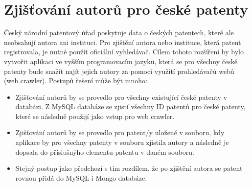 \section{Zjišťování autorů pro české patenty}
Český národní patentový úřad poskytuje data o českých patentech, které ale neobsahují autora ani instituci. Pro zjištění autora nebo instituce, která patent registrovala, je nutné použít oficiální vyhledávač. Cílem tohoto rozšíření by bylo vytvořit aplikaci ve vyšším programovacím jazyku, která se pro všechny české patenty bude snažit najít jejich autory za pomoci využití prohledávačů webů (web crawler). Postupů řešení může být mnoho:
\begin{itemize}
\item Zjišťování autorů by se provedlo pro všechny existující české patenty v databázi. Z MySQL databáze se zjistí všechny ID patentů pro české patenty, které se následně použijí jako vstup pro web crawler.
\item Zjišťování autorů by se provedlo pro patent/y uložené v souboru, kdy aplikace by pro všechny patenty v souboru zjistila autory a následně je dopsala do příslušnýho elementu patentu v daném souboru.
\item Stejný postup jako předchozí s tím rozdílem, že po zjištění autora se patent rovnou přidá do MySQL i Mongo databáze.
\end{itemize}

